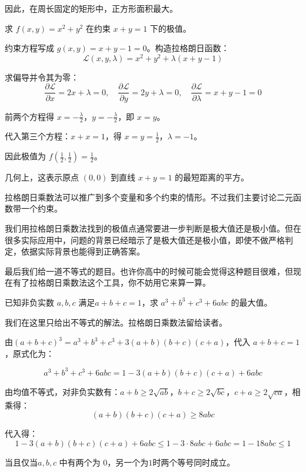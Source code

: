  因此，在周长固定的矩形中，正方形面积最大。

\begin{myexample}
  求 $f(x, y) = x^2 + y^2$ 在约束 $x + y = 1$ 下的极值。

  约束方程写成 $g(x, y) = x + y - 1 = 0$。构造拉格朗日函数：
  \[
  \mathcal{L}(x, y, \lambda) = x^2 + y^2 + \lambda(x + y - 1)
  \]

  求偏导并令其为零：
  \[
  \frac{\partial \mathcal{L}}{\partial x} = 2x + \lambda = 0,\quad
  \frac{\partial \mathcal{L}}{\partial y} = 2y + \lambda = 0,\quad
  \frac{\partial \mathcal{L}}{\partial \lambda} = x + y - 1 = 0
  \]

  前两个方程得 $x = -\frac{\lambda}{2}$，$y = -\frac{\lambda}{2}$，即 $x = y$。
  
  代入第三个方程：$x + x = 1$，得 $x = y = \frac{1}{2}$，$\lambda = -1$。

  因此极值为 $f(\frac{1}{2}, \frac{1}{2}) = \frac{1}{2}$。
  
  几何上，这表示原点 $(0, 0)$ 到直线 $x + y = 1$ 的最短距离的平方。
\end{myexample}

拉格朗日乘数法可以推广到多个变量和多个约束的情形。不过我们主要讨论二元函数带一个约束。

我们用拉格朗日乘数法找到的极值点通常要进一步判断是极大值还是极小值。但在很多实际应用中，问题的背景已经暗示了是极大值还是极小值，即使不做严格判定，依据实际背景也能得到正确答案。

最后我们给一道不等式的题目。也许你高中的时候可能会觉得这种题目很难，但现在有了拉格朗日乘数法这个工具，你不妨用它来算一算。

\begin{myexample}
  已知非负实数 \(a, b, c\) 满足\(a + b + c = 1\)，求 \(a^3 + b^3 + c^3 + 6abc\) 的最大值。

我们在这里只给出不等式的解法。拉格朗日乘数法留给读者。

由$(a+b+c)^3 = a^3+b^3+c^3 + 3(a+b)(b+c)(c+a)$，代入 \(a+b+c=1\)，原式化为：

\[
a^3+b^3+c^3+6abc = 1 - 3(a+b)(b+c)(c+a) + 6abc
\]

由均值不等式，对非负实数有：$a+b \ge 2\sqrt{ab}$，$b+c \ge 2\sqrt{bc}$，$c+a \ge 2\sqrt{ca}$，相乘得：
\[
(a+b)(b+c)(c+a) \ge 8abc
\]

代入得：
\[
1 - 3(a+b)(b+c)(c+a) + 6abc \le 1 - 3 \cdot 8abc + 6abc = 1 - 18abc \le 1
\]

当且仅当\(a,b,c\) 中有两个为 \(0\)，另一个为\(1\)时两个等号同时成立。
\end{myexample}


